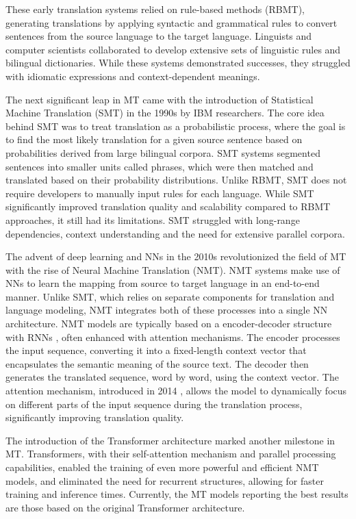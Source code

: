 \documentclass[11pt,english,listoffigures,listoftables]{tfgetsinf}
\begin{document}
These early translation systems relied on rule-based methods (RBMT), generating translations by applying syntactic and grammatical rules to convert sentences from the source language to the target language. Linguists and computer scientists collaborated to develop extensive sets of linguistic rules and bilingual dictionaries. While these systems demonstrated successes, they struggled with idiomatic expressions and context-dependent meanings.

The next significant leap in MT came with the introduction of Statistical Machine Translation (SMT) \cite{brown1990smt} in the 1990s by IBM researchers. The core idea behind SMT was to treat translation as a probabilistic process, where the goal is to find the most likely translation for a given source sentence based on probabilities derived from large bilingual corpora. SMT systems segmented sentences into smaller units called phrases, which were then matched and translated based on their probability distributions. Unlike RBMT, SMT does not require developers to manually input rules for each language. While SMT significantly improved translation quality and scalability compared to RBMT approaches, it still had its limitations. SMT struggled with long-range dependencies, context understanding and the need for extensive parallel corpora.

The advent of deep learning and NNs in the 2010s revolutionized the field of MT with the rise of Neural Machine Translation (NMT). NMT systems make use of NNs to learn the mapping from source to target language in an end-to-end manner. Unlike SMT, which relies on separate components for translation and language modeling, NMT integrates both of these processes into a single NN architecture. NMT models are typically based on a encoder-decoder structure with RNNs \cite{sutskever2014seq2seq}, often enhanced with attention mechanisms. The encoder processes the input sequence, converting it into a fixed-length context vector that encapsulates the semantic meaning of the source text. The decoder then generates the translated sequence, word by word, using the context vector. The attention mechanism, introduced in 2014 \cite{bahdanau2014attention}, allows the model to dynamically focus on different parts of the input sequence during the translation process, significantly improving translation quality.

The introduction of the Transformer architecture marked another milestone in MT. Transformers, with their self-attention mechanism and parallel processing capabilities, enabled the training of even more powerful and efficient NMT models, and eliminated the need for recurrent structures, allowing for faster training and inference times. Currently, the MT models reporting the best results are those based on the original Transformer architecture.
\end{document}
